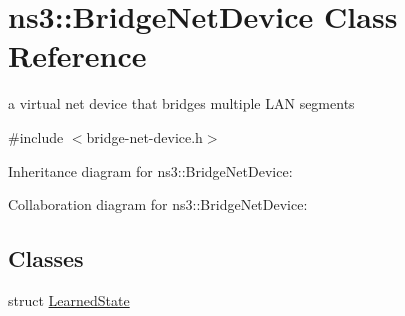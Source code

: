 \hypertarget{classns3_1_1BridgeNetDevice}{}\section{ns3\+:\+:Bridge\+Net\+Device Class Reference}
\label{classns3_1_1BridgeNetDevice}


a virtual net device that bridges multiple L\+AN segments  




{\ttfamily \#include $<$bridge-\/net-\/device.\+h$>$}



Inheritance diagram for ns3\+:\+:Bridge\+Net\+Device\+:


Collaboration diagram for ns3\+:\+:Bridge\+Net\+Device\+:
\subsection*{Classes}
\begin{DoxyCompactItemize}
\item 
struct \hyperlink{structns3_1_1BridgeNetDevice_1_1LearnedState}{Learned\+State}
\end{DoxyCompactItemize}
